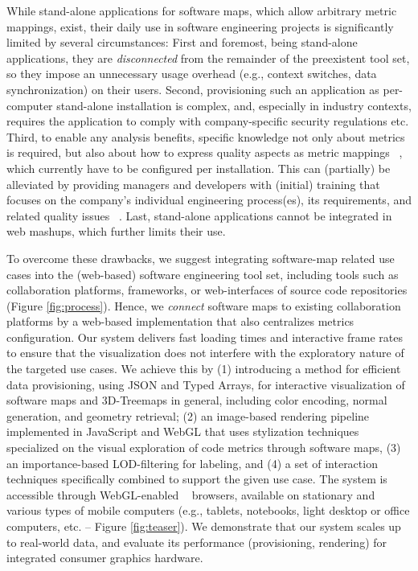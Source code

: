 \documentclass[annual]{acmsiggraph}
\newcommand{\scite}[1]{~\cite{#1}}
\begin{document}
While stand-alone applications for software maps, which allow arbitrary metric mappings, exist, their daily use in software engineering projects is significantly limited by several circumstances:
First and foremost, being stand-alone applications, they are \emph{disconnected} from the remainder of the preexistent tool set, so they impose an unnecessary usage overhead (e.g., context switches, data synchronization) on their users.
Second, provisioning such an application as per-computer stand-alone installation is complex, and, especially in industry contexts, requires the application to comply with company-specific security regulations etc.
Third, to enable any analysis benefits, specific knowledge not only about metrics is required, but also about how to express quality aspects as metric mappings \scite{Kitchenham1996}, which currently have to be configured per installation.
This can (partially) be alleviated by providing managers and developers with (initial) training that focuses on the company's individual engineering process(es), its requirements, and related quality issues \scite{Broy2006,Deissenboeck2009}.
Last, stand-alone applications cannot be integrated in web mashups, which further limits their use.

To overcome these drawbacks, we suggest integrating software-map related use cases into the (web-based) software engineering tool set, including tools such as collaboration platforms, frameworks, or web-interfaces of source code repositories (Figure \ref{fig:process}).
Hence, we \emph{connect} software maps to existing collaboration platforms by a web-based implementation that also centralizes metrics configuration.
Our system delivers fast loading times and interactive frame rates to ensure that the visualization does not interfere with the exploratory nature of the targeted use cases.
We achieve this by (1) introducing a method for efficient data provisioning, using JSON and Typed Arrays, for interactive visualization of software maps and 3D-Treemaps in general, including color encoding, normal generation, and geometry retrieval; (2) an image-based rendering pipeline implemented in JavaScript and WebGL that uses stylization techniques specialized on the visual exploration of code metrics through software maps, (3) an importance-based LOD-filtering for labeling, and (4) a set of interaction techniques specifically combined to support the given use case.
The system is accessible through WebGL-enabled \scite{Marrin2013} browsers, available on stationary and various types of mobile computers (e.g., tablets, notebooks, light desktop or office computers, etc. -- Figure \ref{fig:teaser}).
We demonstrate that our system scales up to real-world data, and evaluate its performance (provisioning, rendering) for integrated consumer graphics hardware.
\end{document}
